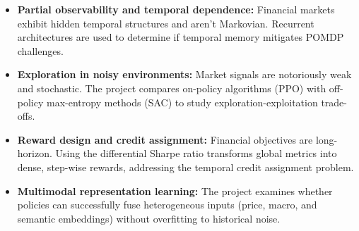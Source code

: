 \documentclass[10pt]{article}
\begin{document}
\begin{itemize}[noitemsep, topsep=3pt]
\item \textbf{Partial observability and temporal dependence:} Financial markets exhibit hidden temporal structures and aren't Markovian. Recurrent architectures are used to determine if temporal memory mitigates POMDP challenges.
\item \textbf{Exploration in noisy environments:} Market signals are notoriously weak and stochastic. The project compares on-policy algorithms (PPO) with off-policy max-entropy methods (SAC) to study exploration-exploitation trade-offs.
\item \textbf{Reward design and credit assignment:} Financial objectives are long-horizon. Using the differential Sharpe ratio transforms global metrics into dense, step-wise rewards, addressing the temporal credit assignment problem.
\item \textbf{Multimodal representation learning:} The project examines whether policies can successfully fuse heterogeneous inputs (price, macro, and semantic embeddings) without overfitting to historical noise.
\end{itemize}
\end{document}
